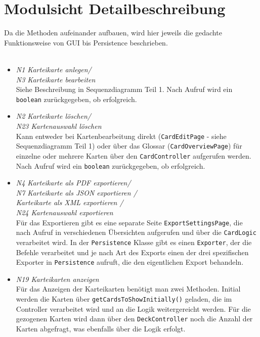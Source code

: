 \documentclass[fontsize=12pt,paper=A4,twoside]{scrartcl}
\begin{document}
    \section{Modulsicht Detailbeschreibung}
    Da die Methoden aufeinander aufbauen, wird hier jeweils die gedachte Funktionsweise von GUI bis Persistence beschrieben.\\\\
    \begin{itemize}
    \item \textit{N1 Karteikarte anlegen/\\ N3 Karteikarte bearbeiten}\\ 
    Siehe Beschreibung in Sequenzdiagramm Teil 1. Nach Aufruf wird ein \texttt{boolean} zurückgegeben, ob erfolgreich.
    \item \textit{N2 Karteikarte löschen/\\ N23 Kartenauswahl löschen}\\ 
    Kann entweder bei Kartenbearbeitung direkt (\texttt{CardEditPage} - siehe Sequenzdiagramm Teil 1) oder über das Glossar (\texttt{CardOverviewPage}) 
    für einzelne oder mehrere Karten über den \texttt{CardController} aufgerufen werden. Nach Aufruf wird ein \texttt{boolean} zurückgegeben, ob erfolgreich.
    \item \textit{N4 Karteikarte als PDF exportieren/\\ 
    N7 Karteikarte als JSON exportieren /\\
    Karteikarte als XML exportieren /\\
    N24 Kartenauswahl exportieren}\\ 
    Für das Exportieren gibt es eine separate Seite \texttt{ExportSettingsPage}, die nach Aufruf 
    in verschiedenen Übersichten aufgerufen und über die \texttt{CardLogic} verarbeitet wird. In der \texttt{Persistence} Klasse gibt es einen \texttt{Exporter}, der die Befehle 
    verarbeitet und je nach Art des Exports einen der drei spezifischen Exporter in \texttt{Persistence} aufruft, die den eigentlichen Export behandeln.
    \item \textit{N19 Karteikarten anzeigen}\\ Für das Anzeigen der Karteikarten benötigt man zwei Methoden. Initial werden die
    Karten über \texttt{getCardsToShowInitially()} geladen, die im Controller verarbeitet wird und an die Logik weitergereicht werden. Für die gezogenen Karten wird
    dann über den \texttt{DeckController} noch die Anzahl der Karten abgefragt, was ebenfalls über die Logik erfolgt.

\end{itemize}
\end{document}
